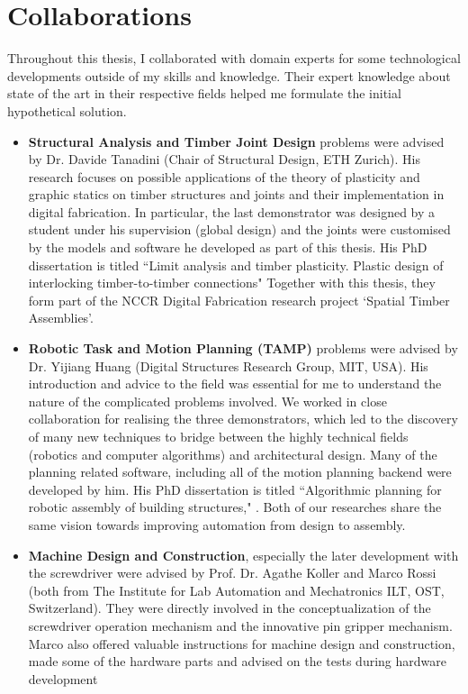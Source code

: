 \section{Collaborations}
\label{section:methodology-collaborations}

Throughout this thesis, I collaborated with domain experts for some technological developments outside of my skills and knowledge. Their expert knowledge about state of the art in their respective fields helped me formulate the initial hypothetical solution. 

\begin{itemize}
	\item \textbf{Structural Analysis and Timber Joint Design }problems were advised by Dr. Davide Tanadini (Chair of Structural Design, ETH Zurich). His research focuses on possible applications of the theory of plasticity and graphic statics on timber structures and joints and their implementation in digital fabrication. In particular, the last demonstrator was designed by a student under his supervision (global design) and the joints were customised by the models and software he developed as part of this thesis. His PhD dissertation is titled ``Limit analysis and timber plasticity. Plastic design of interlocking timber-to-timber connections" \parencite{tanadiniLimitAnalysisTimber2023} Together with this thesis, they form part of the NCCR Digital Fabrication research project ‘Spatial Timber Assemblies’.

	\item \textbf{Robotic Task and Motion Planning (TAMP) }problems were advised by Dr. Yijiang Huang (Digital Structures Research Group, MIT, USA). His introduction and advice to the field was essential for me to understand the nature of the complicated problems involved. We worked in close collaboration for realising the three demonstrators, which led to the discovery of many new techniques to bridge between the highly technical fields (robotics and computer algorithms) and architectural design. Many of the planning related software, including all of the motion planning backend were developed by him. His PhD dissertation is titled ``Algorithmic planning for robotic assembly of building structures," \parencite{huangAlgorithmicPlanningRobotic2022}. Both of our researches share the same vision towards improving automation from design to assembly. 

	\item \textbf{Machine Design and Construction}, especially the later development with the screwdriver were advised by Prof. Dr. Agathe Koller and Marco Rossi (both from The Institute for Lab Automation and Mechatronics ILT, OST, Switzerland). They were directly involved in the conceptualization of the screwdriver operation mechanism and the innovative pin gripper mechanism. Marco also offered valuable instructions for machine design and construction, made some of the hardware parts and advised on the tests during hardware development

\end{itemize}
